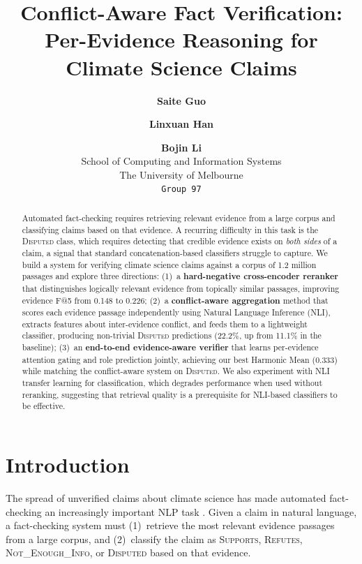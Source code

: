 \documentclass[11pt]{article}
\title{Conflict-Aware Fact Verification:\\
Per-Evidence Reasoning for Climate Science Claims}
\author{
  \textbf{Saite Guo} \and \textbf{Linxuan Han} \and \textbf{Bojin Li} \\
  School of Computing and Information Systems \\
  The University of Melbourne \\
  \texttt{Group 97}
}
\begin{document}
\maketitle

\begin{abstract}

Automated fact-checking requires retrieving relevant evidence from a
large corpus and classifying claims based on that evidence.
A recurring difficulty in this task is the \textsc{Disputed} class,
which requires detecting that credible evidence exists on \emph{both
sides} of a claim, a signal that standard concatenation-based
classifiers struggle to capture.
We build a system for verifying climate science claims against a corpus
of 1.2 million passages and explore three directions:
(1)~a \textbf{hard-negative cross-encoder reranker} that distinguishes
logically relevant evidence from topically similar passages, improving
evidence F@5 from 0.148 to 0.226;
(2)~a \textbf{conflict-aware aggregation} method that scores each
evidence passage independently using Natural Language Inference (NLI),
extracts features about inter-evidence conflict, and feeds them to a
lightweight classifier, producing non-trivial \textsc{Disputed}
predictions (22.2\%, up from 11.1\% in the baseline);
(3)~an \textbf{end-to-end evidence-aware verifier} that learns
per-evidence attention gating and role prediction jointly, achieving
our best Harmonic Mean (0.333) while matching the conflict-aware
system on \textsc{Disputed}.
We also experiment with NLI transfer learning for classification,
which degrades performance when used without reranking, suggesting
that retrieval quality is a prerequisite for NLI-based classifiers
to be effective.

\end{abstract}

\section{Introduction}

The spread of unverified claims about climate science has made automated
fact-checking an increasingly important NLP task
\citep{diggelmann-etal-2020-climate}.
Given a claim in natural language, a fact-checking system must
(1)~retrieve the most relevant evidence passages from a large corpus,
and (2)~classify the claim as \textsc{Supports}, \textsc{Refutes},
\textsc{Not\_Enough\_Info}, or \textsc{Disputed} based on that evidence.
\end{document}
